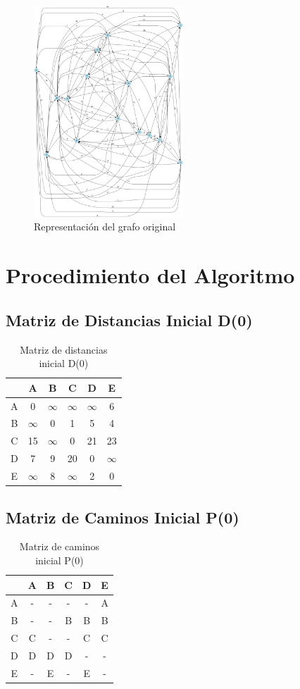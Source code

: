 \documentclass[12pt]{article}
\begin{document}
\begin{figure}[h!]
\centering
\includegraphics[width=0.5\textwidth,keepaspectratio]{grafo.png}
\caption{Representación del grafo original}
\end{figure}

\clearpage
\section{Procedimiento del Algoritmo}
\subsection{Matriz de Distancias Inicial D(0)}
\begin{table}[h!]
\centering
\begin{tabular}{|c|c|c|c|c|c|}
\hline
 & A & B & C & D & E \\\hline
A & 0 & $\infty$ & $\infty$ & $\infty$ & 6 \\\hline
B & $\infty$ & 0 & 1 & 5 & 4 \\\hline
C & 15 & $\infty$ & 0 & 21 & 23 \\\hline
D & 7 & 9 & 20 & 0 & $\infty$ \\\hline
E & $\infty$ & 8 & $\infty$ & 2 & 0 \\\hline
\end{tabular}
\caption{Matriz de distancias inicial D(0)}
\end{table}

\clearpage
\subsection{Matriz de Caminos Inicial P(0)}
\begin{table}[h!]
\centering
\begin{tabular}{|c|c|c|c|c|c|}
\hline
 & A & B & C & D & E \\\hline
A & - & - & - & - & A \\\hline
B & - & - & B & B & B \\\hline
C & C & - & - & C & C \\\hline
D & D & D & D & - & - \\\hline
E & - & E & - & E & - \\\hline
\end{tabular}
\caption{Matriz de caminos inicial P(0)}
\end{table}
\end{document}
